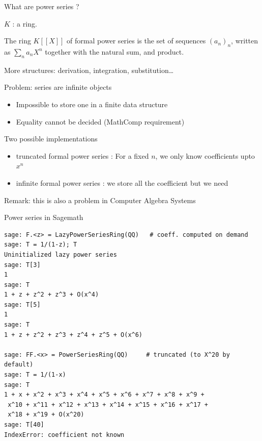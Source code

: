\documentclass[compress,11pt]{beamer}
\renewcommand{\emph}[1]{{\color{red} #1}}
\begin{document}
\begin{frame}{What are power series ?}

  $K$ : a ring.
  \bigskip

  \begin{definition}
    The ring $K[[X]]$ of \emph{formal power series} is the set of sequences
    $(a_n)_n$, written as $\sum_n a_n X^n$ together with the natural sum, and
    product.
  \end{definition}
  More structures: derivation, integration, substitution\dots
  \pause\bigskip

  Problem: series are infinite objects
  \begin{itemize}
  \item Impossible to store one in a finite data structure
    \medskip

  \item Equality cannot be decided (MathComp requirement)
  \end{itemize}
\end{frame}

\begin{frame}{Two possible implementations}

  \begin{NOTE}
    \begin{itemize}
    \item \emph{truncated formal power series} : For a fixed $n$, we only
      know coefficients upto $x^n$ \bigskip

    \item infinite \emph{formal power series} : we store all the coefficient
      but we need 
    \end{itemize}
  \end{NOTE}
  \bigskip

  Remark: this is also a problem in Computer Algebra Systems
\end{frame}


\begin{frame}[fragile]{Power series in Sagemath}

  \scriptsize
  \begin{verbatim}
sage: F.<z> = LazyPowerSeriesRing(QQ)   # coeff. computed on demand
sage: T = 1/(1-z); T
Uninitialized lazy power series
sage: T[3]
1
sage: T
1 + z + z^2 + z^3 + O(x^4)
sage: T[5]
1
sage: T
1 + z + z^2 + z^3 + z^4 + z^5 + O(x^6)

sage: FF.<x> = PowerSeriesRing(QQ)     # truncated (to X^20 by default)
sage: T = 1/(1-x)
sage: T
1 + x + x^2 + x^3 + x^4 + x^5 + x^6 + x^7 + x^8 + x^9 +
 x^10 + x^11 + x^12 + x^13 + x^14 + x^15 + x^16 + x^17 +
 x^18 + x^19 + O(x^20)
sage: T[40]
IndexError: coefficient not known
  \end{verbatim}
\end{frame}
\end{document}
